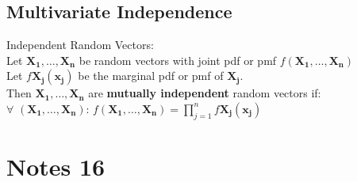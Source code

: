 \documentclass{article}
\begin{document}
\begin{flushleft}
\subsection*{Multivariate Independence}
Independent Random Vectors:\\
Let $\boldsymbol{X_1},\dots,\boldsymbol{X_n}$ be random vectors with joint pdf or pmf $f(\boldsymbol{X_1},\dots,\boldsymbol{X_n})$\\
Let $f\boldsymbol{X_j}(\boldsymbol{x_j})$ be the marginal pdf or pmf of $\boldsymbol{X_j}$.\\
Then $\boldsymbol{X_1},\dots,\boldsymbol{X_n}$ are \textbf{mutually independent} random vectors if:\\
$\forall$ $(\boldsymbol{X_1},\dots,\boldsymbol{X_n})$: \quad  $f(\boldsymbol{X_1},\dots,\boldsymbol{X_n})=\prod_{j=1}^{n}f\boldsymbol{X_j}(\boldsymbol{x_j})$

\section*{Notes 16}

\end{flushleft}
\end{document}
